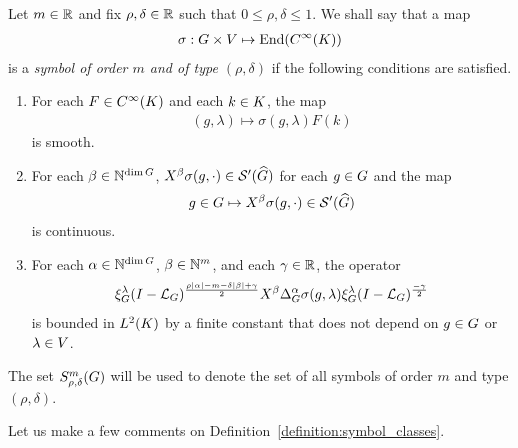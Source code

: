 \begin{definition}
\label{definition:symbol_classes}
    Let $m \in \mathbb{R}$ and fix $\rho, \delta \in \mathbb{R}$ such that $0 \leq \rho, \delta \leq 1$.
    We shall say that a map
    \begin{align*}
        \sigma : G \times V \mapsto \operatorname{End}({C^\infty(K)})
    \end{align*}
    is a \emph{symbol of order $m$ and of type $(\rho, \delta)$} if the following conditions are satisfied.
    \begin{enumerate}
        \item
            For each $F \in {C^\infty(K)}$ and each $k \in K$,
            the map
            \begin{align*}
                (g, \lambda) \mapsto \sigma(g, \lambda) F(k)
            \end{align*}
            is smooth.
        \item
            For each $\beta \in \mathbb{N}^{\dim G}$,
            $\LeftDifferentialOperator \beta \sigma(g, \dummy) \in \TemperedDistributions {\dualGroup \Group}$
            for each $g \in G$ and the map
            \begin{align*}
                g \in \Group \mapsto \LeftDifferentialOperator \beta \sigma(g, \dummy) \in \TemperedDistributions {\dualGroup \Group}
            \end{align*}
            is continuous.
        \item \label{item:symbol_bound_condition}
            For each $\alpha \in \mathbb{N}^{\dim G}$, $\beta \in \mathbb{N}^m$, and each $\gamma \in \mathbb{R}$,
            the operator
            \begin{align*}
                \Rep{\lambda} \BesselPotential{\rho \abs\alpha - m - \delta \abs\beta + \gamma} \LeftDifferentialOperator{\beta} \DifferenceOperatorOrder{\alpha} \sigma(g, \lambda) \Rep{\lambda} \BesselPotential{-\gamma}
            \end{align*}
            is bounded in ${L^{2} (K)}$ by a finite constant that does not depend on $g \in G$ or $\lambda \in V$.
    \end{enumerate}

    The set $S^{m}_{\rho, \delta}(G)$ will be used to denote the set of all symbols of order $m$ and type $(\rho, \delta)$.
\end{definition}

Let us make a few comments on Definition~\ref{definition:symbol_classes}.

